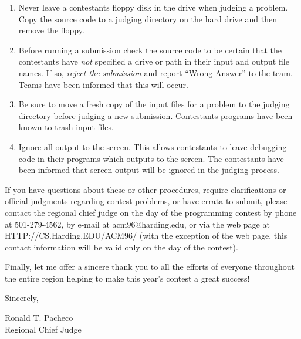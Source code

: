 \begin{enumerate}

\item Never leave a contestants floppy disk in the drive when judging
a problem.  Copy the source code to a judging directory on the hard
drive and then remove the floppy.

\item Before running a submission check the source code to be certain
that the contestants have {\em not\/} specified a drive or path in
their input and output file names.  If so, {\em reject the
submission\/} and report ``Wrong Answer'' to the team.  Teams
have been informed that this will occur.

\item Be sure to move a fresh copy of the input files for a problem to
the judging directory before judging a new submission.  Contestants
programs have been known to trash input files.

\item Ignore all output to the screen.  This allows contestants to
leave debugging code in their programs which outputs to the screen.
The contestants have been informed that screen output will be ignored
in the judging process.

\end{enumerate}

If you have questions about these or other procedures, require
clarifications or official judgments regarding contest problems, or
have errata to submit, please contact the regional chief judge on the
day of the programming contest by phone at 501-279-4562, by e-mail at
acm96@harding.edu, or via the web page at HTTP://CS.Harding.EDU/ACM96/
(with the exception of the web page, this contact information will be
valid only on the day of the contest).

Finally, let me offer a sincere thank you to all the efforts of
everyone throughout the entire region helping to make this year's
contest a great success!

Sincerely,

\bigskip\bigskip

Ronald T. Pacheco\\
Regional Chief Judge


